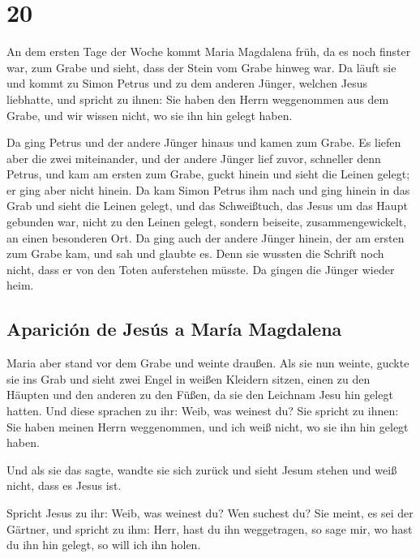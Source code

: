 \hypertarget{section-19}{%
\section{20}\label{section-19}}

 An dem ersten Tage der Woche kommt Maria Magdalena früh,
da es noch finster war, zum Grabe und sieht, dass der Stein vom Grabe
hinweg war.  Da läuft sie und kommt zu Simon Petrus und zu
dem anderen Jünger, welchen Jesus liebhatte, und spricht zu ihnen: Sie
haben den Herrn weggenommen aus dem Grabe, und wir wissen nicht, wo sie
ihn hin gelegt haben.

 Da ging Petrus und der andere Jünger hinaus und kamen zum
Grabe.  Es liefen aber die zwei miteinander, und der
andere Jünger lief zuvor, schneller denn Petrus, und kam am ersten zum
Grabe,  guckt hinein und sieht die Leinen gelegt; er ging
aber nicht hinein.  Da kam Simon Petrus ihm nach und ging
hinein in das Grab und sieht die Leinen gelegt,  und das
Schweißtuch, das Jesus um das Haupt gebunden war, nicht zu den Leinen
gelegt, sondern beiseite, zusammengewickelt, an einen besonderen Ort.
 Da ging auch der andere Jünger hinein, der am ersten zum
Grabe kam, und sah und glaubte es.  Denn sie wussten die
Schrift noch nicht, dass er von den Toten auferstehen müsste.
 Da gingen die Jünger wieder heim.

\hypertarget{apariciuxf3n-de-jesuxfas-a-maruxeda-magdalena}{%
\subsection{Aparición de Jesús a María
Magdalena}\label{apariciuxf3n-de-jesuxfas-a-maruxeda-magdalena}}

 Maria aber stand vor dem Grabe und weinte draußen. Als
sie nun weinte, guckte sie ins Grab  und sieht zwei Engel
in weißen Kleidern sitzen, einen zu den Häupten und den anderen zu den
Füßen, da sie den Leichnam Jesu hin gelegt hatten.  Und
diese sprachen zu ihr: Weib, was weinest du? Sie spricht zu ihnen: Sie
haben meinen Herrn weggenommen, und ich weiß nicht, wo sie ihn hin
gelegt haben.

 Und als sie das sagte, wandte sie sich zurück und sieht
Jesum stehen und weiß nicht, dass es Jesus ist.

 Spricht Jesus zu ihr: Weib, was weinest du? Wen suchest
du? Sie meint, es sei der Gärtner, und spricht zu ihm: Herr, hast du ihn
weggetragen, so sage mir, wo hast du ihn hin gelegt, so will ich ihn
holen.

